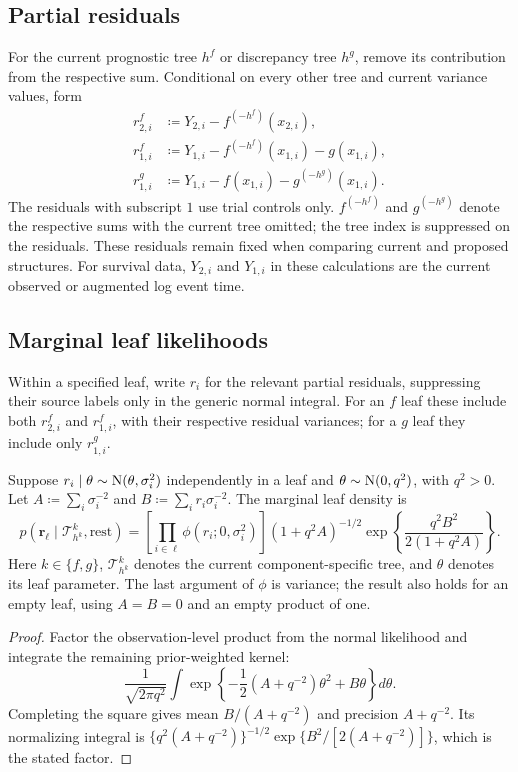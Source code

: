 \subsection{Partial residuals}\label{sec:A.2}
For the current prognostic tree $h^f$ or discrepancy tree $h^g$, remove its contribution from the respective sum. Conditional on every other tree and current variance values, form
\begin{equation}\label{eq:partial}
\begin{aligned}
r_{2,i}^f&\coloneqq Y_{2,i}-f^{(-h^f)}(x_{2,i}),\\
r_{1,i}^f&\coloneqq Y_{1,i}-f^{(-h^f)}(x_{1,i})-g(x_{1,i}),\\
r_{1,i}^g&\coloneqq Y_{1,i}-f(x_{1,i})-g^{(-h^g)}(x_{1,i}).
\end{aligned}
\end{equation}
The residuals with subscript $1$ use trial controls only. $f^{(-h^f)}$ and $g^{(-h^g)}$ denote the respective sums with the current tree omitted; the tree index is suppressed on the residuals. These residuals remain fixed when comparing current and proposed structures. For survival data, $Y_{2,i}$ and $Y_{1,i}$ in these calculations are the current observed or augmented log event time.

\subsection{Marginal leaf likelihoods}\label{sec:A.3}
Within a specified leaf, write $r_i$ for the relevant partial residuals, suppressing their source labels only in the generic normal integral. For an $f$ leaf these include both $r_{2,i}^f$ and $r_{1,i}^f$, with their respective residual variances; for a $g$ leaf they include only $r_{1,i}^g$.
\begin{lemma}\label{lem:leaf}
Suppose $r_i\mid\theta\sim\mathrm{N}(\theta,\sigma_i^2)$ independently in a leaf and $\theta\sim\mathrm{N}(0,q^2)$, with $q^2>0$. Let $A\coloneqq \sum_i\sigma_i^{-2}$ and $B\coloneqq \sum_i r_i\sigma_i^{-2}$. The marginal leaf density is
\begin{equation}\label{eq:leafdensity}
p(\mathbf r_\ell\mid \mathcal T_{h^k}^k,\text{rest})=
\left[\prod_{i\in\ell}\phi(r_i;0,\sigma_i^2)\right]
(1+q^2A)^{-1/2}\exp\!\left\{\frac{q^2B^2}{2(1+q^2A)}\right\}.
\end{equation}
Here $k\in\{f,g\}$, $\mathcal T_{h^k}^k$ denotes the current component-specific tree, and $\theta$ denotes its leaf parameter. The last argument of $\phi$ is variance; the result also holds for an empty leaf, using $A=B=0$ and an empty product of one.
\end{lemma}
\begin{proof}
Factor the observation-level product from the normal likelihood and integrate the remaining prior-weighted kernel:
\begin{equation}
\frac{1}{\sqrt{2\pi q^2}}\int\exp\left\{-\frac12(A+q^{-2})\theta^2+B\theta\right\}d\theta.
\end{equation}
Completing the square gives mean $B/(A+q^{-2})$ and precision $A+q^{-2}$. Its normalizing integral is $\{q^2(A+q^{-2})\}^{-1/2}\exp\{B^2/[2(A+q^{-2})]\}$, which is the stated factor.
\end{proof}

